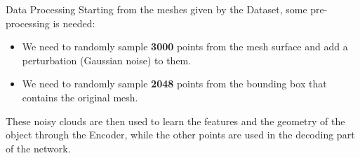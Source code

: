 \documentclass{beamer}
\begin{document}
\begin{frame}{Data Processing}
    Starting from the meshes given by the Dataset, some pre-processing is needed:
    \begin{itemize}
        \item We need to randomly sample \textbf{3000} points from the mesh surface and add a perturbation (Gaussian noise) to them.
        \item We need to randomly sample \textbf{2048} points from the bounding box that contains the original mesh.
    \end{itemize}
    These noisy clouds are then used to learn the features and the geometry of the object through the Encoder, while the other points are used in the decoding part of the network.
\end{frame}
\end{document}
